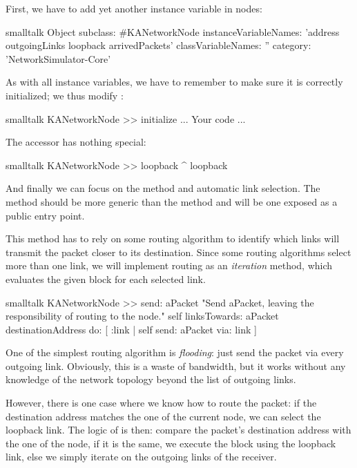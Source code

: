 \documentclass[10pt,twoside,english]{_support/latex/sbabook/sbabook}
\begin{document}
First, we have to add yet another instance variable in nodes:

\begin{displaycode}{smalltalk}
Object subclass: #KANetworkNode
    instanceVariableNames: 'address outgoingLinks loopback arrivedPackets'
    classVariableNames: ''
    category: 'NetworkSimulator-Core'
\end{displaycode}

As with all instance variables, we have to remember to make sure it is correctly initialized; we thus modify :

\begin{displaycode}{smalltalk}
KANetworkNode >> initialize
    ... Your code ...
\end{displaycode}

The accessor has nothing special:

\begin{displaycode}{smalltalk}
KANetworkNode >> loopback
    ^ loopback
\end{displaycode}

And finally we can focus on the  method and automatic link selection. The method  should be more generic than the method  and will be one exposed as a public entry point.

This method has to rely on some routing algorithm to identify which links will transmit the packet closer to its destination.
Since some routing algorithms select more than one link, we will implement routing as an \textit{iteration} method, which evaluates the given block for each selected link.

\begin{displaycode}{smalltalk}
KANetworkNode >> send: aPacket
    "Send aPacket, leaving the responsibility of routing to the node."
    self
        linksTowards: aPacket destinationAddress
        do: [ :link | self send: aPacket via: link ]
\end{displaycode}

One of the simplest routing algorithm is \textit{flooding}: just send the packet via every outgoing link.
Obviously, this is a waste of bandwidth, but it works without any knowledge of the network topology beyond the list of outgoing links.

However, there is one case where we know how to route the packet: if the destination address matches the one of the current node, we can select the loopback link.
The logic of  is then: compare the packet's destination address with the one of the node, if it is the same, we execute the block using the loopback link, else we simply iterate on the outgoing links of the receiver.
\end{document}
